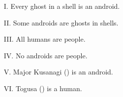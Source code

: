 \begin{enumerate}
        \begin{center}
            \begin{minipage}{0.45\linewidth}
                \begin{enumerate}
                    \item[I.]
                        Every ghost in a shell is an android.
                    \item[II.]
                        Some androids are ghosts in shells.
                    \item[III.]
                        All humans are people.
                \end{enumerate}
            \end{minipage}%
            \begin{minipage}{0.45\linewidth}
                \begin{enumerate}
                    \item[IV.]
                        No androids are people.
                    \item[V.]
                        Major Kusanagi () is an android.
                    \item[VI.]
                        Togusa () is a human.
                \end{enumerate}
            \end{minipage}
        \end{center}


\end{enumerate}
